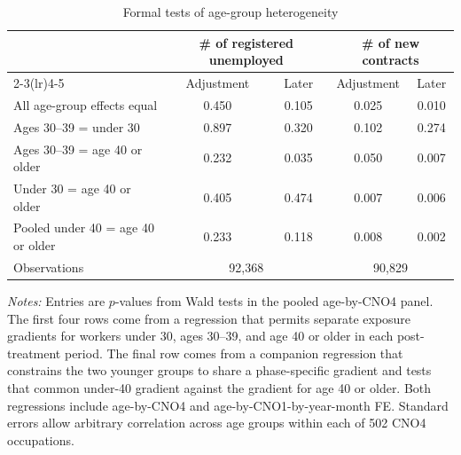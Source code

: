 \begin{table}[!htbp]
\centering
\caption{Formal tests of age-group heterogeneity}
\label{tab:v1_age_cross_group_tests}
\begin{threeparttable}
\small
\setlength{\tabcolsep}{5pt}
\begin{tabular}{lcccc}
\toprule
& \multicolumn{2}{c}{\# of registered unemployed} & \multicolumn{2}{c}{\# of new contracts} \\
\cmidrule(lr){2-3}\cmidrule(lr){4-5}
& Adjustment & Later & Adjustment & Later \\
\midrule
All age-group effects equal & 0.450 & 0.105 & 0.025 & 0.010 \\
Ages 30--39 = under 30 & 0.897 & 0.320 & 0.102 & 0.274 \\
Ages 30--39 = age 40 or older & 0.232 & 0.035 & 0.050 & 0.007 \\
Under 30 = age 40 or older & 0.405 & 0.474 & 0.007 & 0.006 \\
Pooled under 40 = age 40 or older & 0.233 & 0.118 & 0.008 & 0.002 \\
\midrule
Observations & \multicolumn{2}{c}{92,368} & \multicolumn{2}{c}{90,829} \\
\bottomrule
\end{tabular}
\begin{tablenotes}[flushleft]
\footnotesize
\item \emph{Notes:} Entries are $p$-values from Wald tests in the pooled age-by-CNO4 panel. The first four rows come from a regression that permits separate exposure gradients for workers under 30, ages 30--39, and age 40 or older in each post-treatment period. The final row comes from a companion regression that constrains the two younger groups to share a phase-specific gradient and tests that common under-40 gradient against the gradient for age 40 or older. Both regressions include age-by-CNO4 and age-by-CNO1-by-year-month FE. Standard errors allow arbitrary correlation across age groups within each of 502 CNO4 occupations.
\end{tablenotes}
\end{threeparttable}
\end{table}
